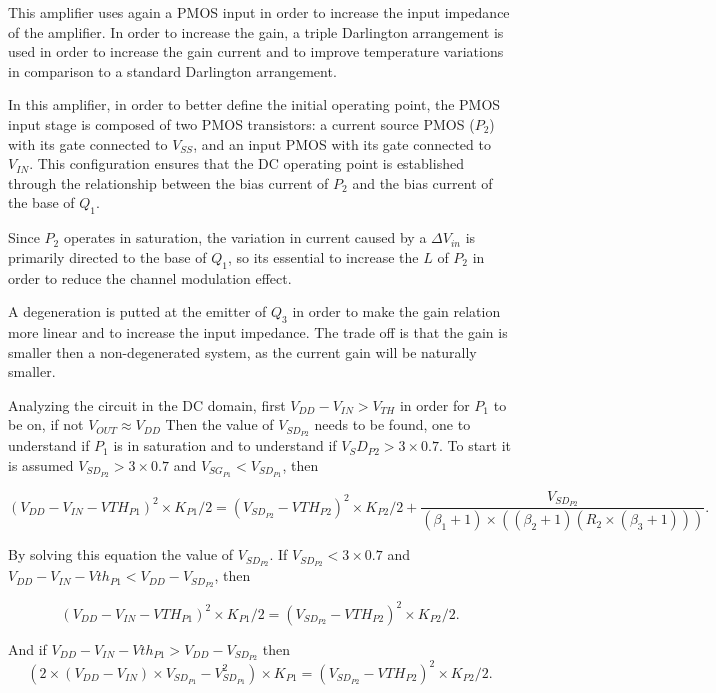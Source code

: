 \documentclass[12pt]{article}
\begin{document}
This amplifier uses again a PMOS input in order to increase the input impedance of the amplifier. In order to increase the gain, a triple Darlington arrangement is used in order to increase the gain current and to improve temperature variations in comparison to a standard Darlington arrangement.

In this amplifier, in order to better define the initial operating point, the PMOS input stage is composed of two PMOS transistors: a current source PMOS ($P_2$) with its gate connected to $V_{SS}$, and an input PMOS with its gate connected to $V_{IN}$. This configuration ensures that the DC operating point is established through the relationship between the bias current of $P_2$ and the bias current of the base of $Q_1$.  

Since $P_2$ operates in saturation, the variation in current caused by a $\Delta V_{in}$ is primarily directed to the base of $Q_1$, so its essential to increase the $L$ of $P_{2}$ in order to reduce the channel modulation effect.

 A degeneration is putted  at the emitter of $Q_3$ in order to make the gain relation more linear and to increase the input impedance. The trade off is that the gain is smaller then a non-degenerated system, as the current gain will be naturally smaller.



Analyzing the circuit in the DC domain, first $V_{DD} -V_{IN} > V_{TH}$ in order for $P_1$ to be on, if not $V_{OUT} \approx V_{DD}$
Then the value of $V_{SD_{P2}}$ needs to be found, one to understand if $P_1$ is in saturation and to understand if $V_S{D_{P2}} > 3 \times 0.7$.
To start it is assumed $V_{SD_{P2}} >  3 \times 0.7$ and $V_{SG_{P1}}<V_{SD_{P1}}$, then

\[
    (V_{DD} - V_{IN} -VTH_{P1})^2 \times K_{P1}/2 = (V_{SD_{P2}} -VTH_{P2})^2 \times K_{P2}/2 + \frac{V_{SD_{P2}}}{(\beta_1+1) \times ((\beta_2 +1)(R_2 \times (\beta_3 +1) ))}.
\]

By solving this equation the value of $V_{SD_{P2}}$. If $V_{SD_{P2}} < 3 \times 0.7$ and $ V_{DD} - V_{IN} - Vth_{P1} < V_{DD} - V_{SD_{P2}}$, then

\[
    (V_{DD} - V_{IN} -VTH_{P1})^2 \times K_{P1}/2 = (V_{SD_{P2}} -VTH_{P2})^2 \times K_{P2}/2.
\]

And if $ V_{DD} - V_{IN} - Vth_{P1} > V_{DD} - V_{SD_{P2}}$ then 
\[
    (2 \times (V_{DD} - V_{IN}) \times V_{SD_{P1}} - V_{SD_{P1}}^2) \times K_{P1} = (V_{SD_{P2}} -VTH_{P2})^2 \times K_{P2}/2.
\]
\end{document}
